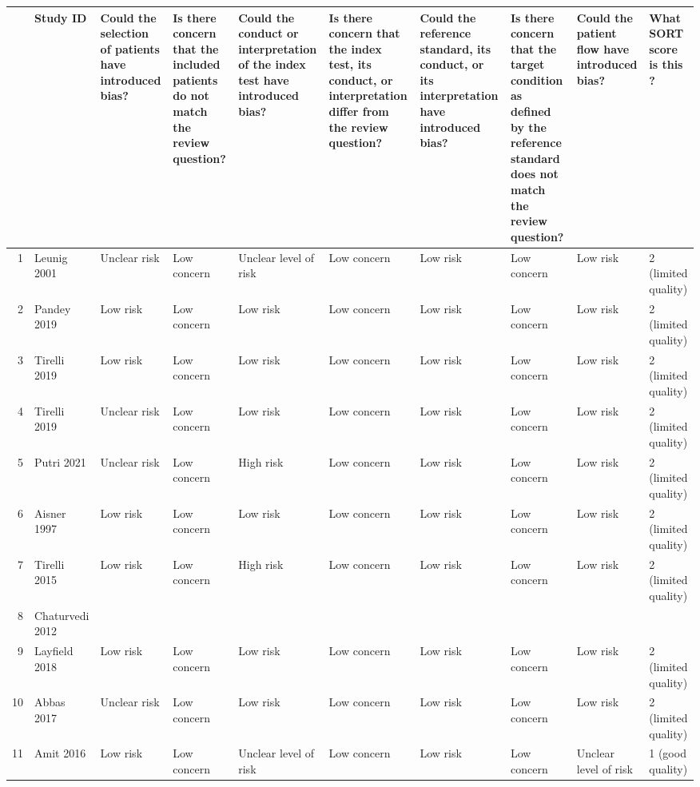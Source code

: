 \begin{table}[ht]
\centering
\begingroup\tiny
\begin{tabular}{rlllllllll}
  \hline
 & Study ID & Could the selection of patients have introduced bias? & Is there concern that the included patients do not match the review question? & Could the conduct or interpretation of the index test have introduced bias? & Is there concern that the index test, its conduct, or interpretation differ from the review question? & Could the reference standard, its conduct, or its interpretation have introduced bias? & Is there concern that the target condition as defined by the reference standard does not match the review question? & Could the patient flow have introduced bias? & What SORT score is this ? \\ 
  \hline
1 & Leunig 2001 & Unclear risk & Low concern & Unclear level of risk & Low concern & Low risk & Low concern & Low risk & 2 (limited quality) \\ 
  2 & Pandey 2019 & Low risk & Low concern & Low risk & Low concern & Low risk & Low concern & Low risk & 2 (limited quality) \\ 
  3 & Tirelli 2019 & Low risk & Low concern & Low risk & Low concern & Low risk & Low concern & Low risk & 2 (limited quality) \\ 
  4 & Tirelli 2019 & Unclear risk & Low concern & Low risk & Low concern & Low risk & Low concern & Low risk & 2 (limited quality) \\ 
  5 & Putri 2021 & Unclear risk & Low concern & High risk & Low concern & Low risk & Low concern & Low risk & 2 (limited quality) \\ 
  6 & Aisner 1997 & Low risk & Low concern & Low risk & Low concern & Low risk & Low concern & Low risk & 2 (limited quality) \\ 
  7 & Tirelli 2015 & Low risk & Low concern & High risk & Low concern & Low risk & Low concern & Low risk & 2 (limited quality) \\ 
  8 & Chaturvedi 2012 &  &  &  &  &  &  &  &  \\ 
  9 & Layfield 2018 & Low risk & Low concern & Low risk & Low concern & Low risk & Low concern & Low risk & 2 (limited quality) \\ 
  10 & Abbas 2017 & Unclear risk & Low concern & Low risk & Low concern & Low risk & Low concern & Low risk & 2 (limited quality) \\ 
  11 & Amit 2016 & Low risk & Low concern & Unclear level of risk & Low concern & Low risk & Low concern & Unclear level of risk & 1 (good quality) \\ 

\end{tabular}
\end{table}
